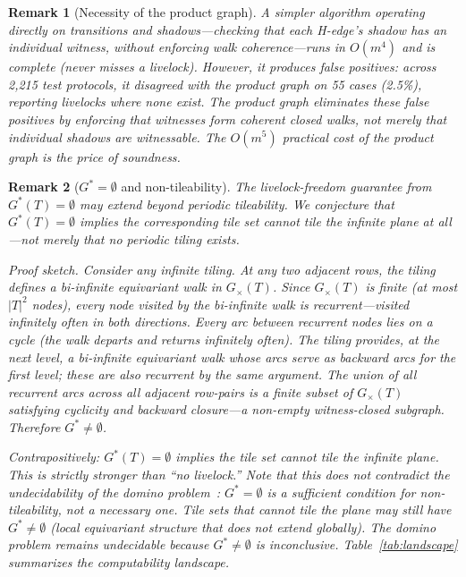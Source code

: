 \documentclass[11pt]{article}
\newtheorem{remark}{Remark}
\begin{document}
\begin{remark}[Necessity of the product graph]
A simpler algorithm operating directly on transitions and shadows---checking that each H-edge's shadow has an individual witness, without enforcing walk coherence---runs in $O(m^4)$ and is complete (never misses a livelock). However, it produces false positives: across 2{,}215 test protocols, it disagreed with the product graph on 55 cases (2.5\%), reporting livelocks where none exist. The product graph eliminates these false positives by enforcing that witnesses form coherent closed walks, not merely that individual shadows are witnessable. The $O(m^5)$ practical cost of the product graph is the price of soundness.
\end{remark}

\begin{remark}[$G^* = \emptyset$ and non-tileability]
\label{rem:non-tile}
The livelock-freedom guarantee from $G^*(T) = \emptyset$ may extend beyond periodic tileability. We conjecture that $G^*(T) = \emptyset$ implies the corresponding tile set cannot tile the infinite plane at all---not merely that no periodic tiling exists.

\emph{Proof sketch.} Consider any infinite tiling. At any two adjacent rows, the tiling defines a bi-infinite equivariant walk in $G_\times(T)$. Since $G_\times(T)$ is finite (at most $|T|^2$ nodes), every node visited by the bi-infinite walk is \emph{recurrent}---visited infinitely often in both directions. Every arc between recurrent nodes lies on a cycle (the walk departs and returns infinitely often). The tiling provides, at the next level, a bi-infinite equivariant walk whose arcs serve as backward arcs for the first level; these are also recurrent by the same argument. The union of all recurrent arcs across all adjacent row-pairs is a finite subset of $G_\times(T)$ satisfying cyclicity and backward closure---a non-empty witness-closed subgraph. Therefore $G^* \neq \emptyset$.

Contrapositively: $G^*(T) = \emptyset$ implies the tile set cannot tile the infinite plane. This is strictly stronger than ``no livelock.'' Note that this does \emph{not} contradict the undecidability of the domino problem~\cite{wang-tiles,berger}: $G^* = \emptyset$ is a sufficient condition for non-tileability, not a necessary one. Tile sets that cannot tile the plane may still have $G^* \neq \emptyset$ (local equivariant structure that does not extend globally). The domino problem remains undecidable because $G^* \neq \emptyset$ is inconclusive. Table~\ref{tab:landscape} summarizes the computability landscape.
\end{remark}
\end{document}
